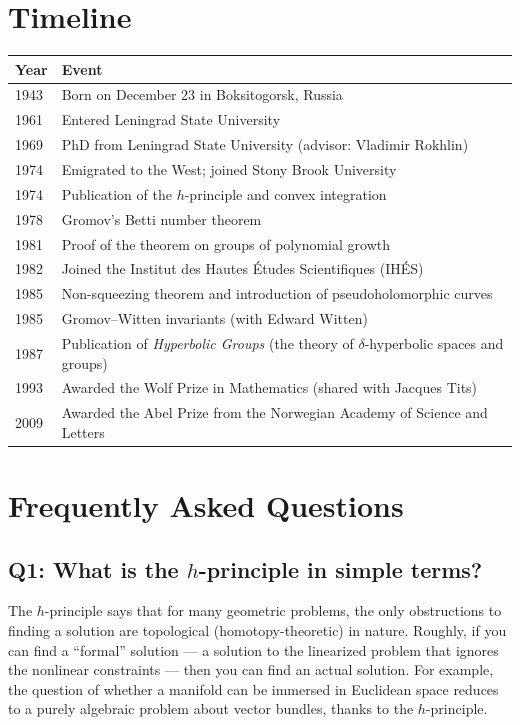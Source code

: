 \section*{Timeline}
\begin{tabularx}{\linewidth}{|p{1.5cm}|>{\raggedright\arraybackslash}X|}
\hline
\textbf{Year} & \textbf{Event} \\ \hline
1943 & Born on December 23 in Boksitogorsk, Russia \\ \hline
1961 & Entered Leningrad State University \\ \hline
1969 & PhD from Leningrad State University (advisor: Vladimir Rokhlin) \\ \hline
1974 & Emigrated to the West; joined Stony Brook University \\ \hline
1974 & Publication of the \(h\)-principle and convex integration \\ \hline
1978 & Gromov's Betti number theorem \\ \hline
1981 & Proof of the theorem on groups of polynomial growth \\ \hline
1982 & Joined the Institut des Hautes \'Etudes Scientifiques (IH\'ES) \\ \hline
1985 & Non-squeezing theorem and introduction of pseudoholomorphic curves \\ \hline
1985 & Gromov--Witten invariants (with Edward Witten) \\ \hline
1987 & Publication of \textit{Hyperbolic Groups} (the theory of \(\delta\)-hyperbolic spaces and groups) \\ \hline
1993 & Awarded the Wolf Prize in Mathematics (shared with Jacques Tits) \\ \hline
2009 & Awarded the Abel Prize from the Norwegian Academy of Science and Letters \\ \hline
\end{tabularx}

\section{Frequently Asked Questions}

\subsection*{Q1: What is the \(h\)-principle in simple terms?}

The \(h\)-principle says that for many geometric problems, the only obstructions to finding a solution are topological (homotopy-theoretic) in nature. Roughly, if you can find a ``formal'' solution --- a solution to the linearized problem that ignores the nonlinear constraints --- then you can find an actual solution. For example, the question of whether a manifold can be immersed in Euclidean space reduces to a purely algebraic problem about vector bundles, thanks to the \(h\)-principle.

